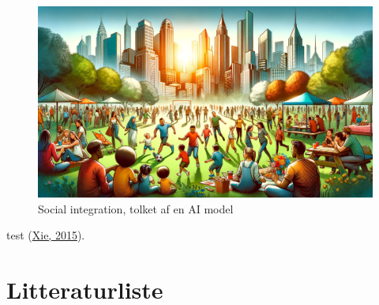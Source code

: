 \documentclass[
]{book}
\begin{document}
\begin{figure}
\includegraphics[width=24.89in]{images/dalle-integration} \caption{Social integration, tolket af en AI model}\label{fig:fig-integration}
\end{figure}

test (\protect\hyperlink{ref-xie2015}{Xie, 2015}).

\hypertarget{litteraturliste}{%
\chapter*{Litteraturliste}\label{litteraturliste}}
\end{document}

